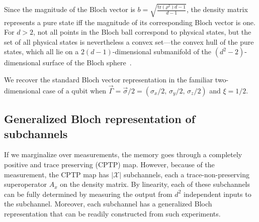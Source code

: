 \documentclass[prx,nofootinbib,onecolumn,showkeys,groupaddress,preprintnumbers,floatfix,
superscriptaddress]{revtex4-1}
\newcommand{\tr}{\text{tr}}
\newcommand{\constname}{\xi}
\begin{document}
Since the magnitude of the
Bloch vector is 
$b = \sqrt{\frac{\tr(\rho^2) d - 1}{d-1}}$,
the density matrix represents a pure state iff
the magnitude of its corresponding Bloch vector is one.  For $d>2$, not all points in the Bloch ball correspond to physical states, but the set of all physical states is nevertheless a convex set---the convex hull of the pure states, which all lie on a $2(d-1)$-dimensional submanifold of the $(d^{2}-2)$-dimensional surface of the Bloch sphere~\cite{Jako01}.


We recover the standard Bloch vector representation
in the familiar two-dimensional case of a qubit
when 
$\vec{\Gamma} = \vec{\sigma}/2 = ( \sigma_x/2, \, \sigma_y/2, \, \sigma_z/2 )$ and $\constname = 1/2$.






\subsection{Generalized Bloch representation of subchannels}


If we marginalize over measurements, the memory goes through
a completely positive and trace preserving (CPTP) map.  However, because of the measurement, the CPTP map has 
$|\mathcal{X}|$ subchannels, each a trace-non-preserving superoperator $A_x$ on the density matrix.
By linearity, each of these
subchannels 
can be fully determined by
measuring the output from $d^2$ independent inputs to the subchannel.  
Moreover, each subchannel has a generalized Bloch representation that can be readily constructed from such experiments.
\end{document}
